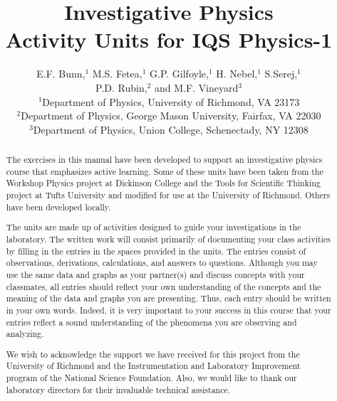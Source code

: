 \documentclass[twoside]{article}
\begin{document}
\title{Investigative Physics\\ Activity Units for IQS Physics-1}


\author{E.F. Bunn,$^1$ M.S. Fetea,$^1$
G.P. Gilfoyle,$^1$ H. Nebel,$^1$ S.Serej,$^1$ \\ P.D. Rubin,$^2$ and M.F. Vineyard$^3$\\[8pt]
$^1$Department of Physics, University of Richmond, VA 23173 \\[4pt]
$^2$Department of Physics, George Mason University, Fairfax, VA  22030 \\[4pt]
$^3$Department of Physics, Union College, Schenectady, NY 12308}

\maketitle
\begin{abstract}
The exercises in this manual have been developed to support an investigative
physics course that emphasizes active learning. Some of these units have been
taken from the Workshop Physics project at Dickinson College and the Tools for
Scientific Thinking project at Tufts University and modified for use at the
University of Richmond. Others have been developed locally.

The units are made up of activities designed to guide your investigations in
the laboratory. The written work will consist primarily of documenting your
class activities by filling in the entries in the spaces provided in the units.
The entries consist of observations, derivations, calculations, and answers
to questions. Although you may use the same data and graphs as your partner(s)
and discuss concepts with your classmates, all entries should reflect your own
understanding of the concepts and the meaning of the data and graphs you are
presenting. Thus, each entry should be written in your own words. Indeed, it
is very important to your success in this course that your entries reflect a
sound understanding of the phenomena you are observing and analyzing.

We wish to acknowledge the support we have received for this project from the
University of Richmond and the Instrumentation and Laboratory Improvement program 
of the National Science Foundation. Also, we would like to thank our laboratory 
directors for their invaluable technical assistance.
\end{abstract}
\end{document}

